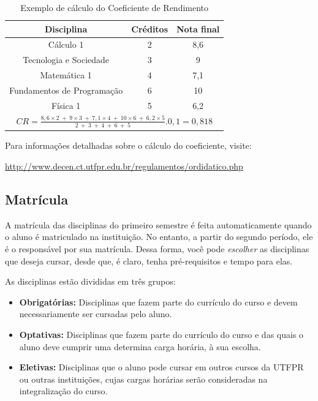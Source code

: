 \documentclass[a4paper,12pt,openany]{article}
\begin{document}
\begin{table}[h!] \centering
    \begin{spacing}{1.5}
    \begin{tabular}{|c|c|c|} \hline
        Disciplina & Créditos & Nota final \\ \hline
        Cálculo 1 & 2 & 8,6 \\ \hline
        Tecnologia e Sociedade & 3 & 9 \\ \hline
        Matemática 1 & 4 & 7,1 \\ \hline
        Fundamentos de Programação & 6 & 10 \\ \hline
        Física 1 & 5 & 6,2 \\ \hline
        \multicolumn{3}{|c|}{$CR = \frac{8,6 \times 2\ +\ 9 \times 3\ +\ 7,1 \times 4\ +\ 10 \times 6\ +\ 6,2 \times 5}{2\ +\ 3\ +\ 4\ +\ 6\ +\ 5} . 0,1 = 0,818 $ } \\ \hline
    \end{tabular}
    \end{spacing}
    \caption{Exemplo de cálculo do Coeficiente de Rendimento}
    \label{tbl01}

\end{table}

Para informações detalhadas sobre o cálculo do coeficiente, visite: 

\url{http://www.decen.ct.utfpr.edu.br/regulamentos/ordidatico.php}



\subsection{Matrícula}

A matrícula das disciplinas do primeiro semestre é feita automaticamente quando o aluno é matriculado na instituição. No entanto, a partir do segundo período, ele é o responsável por sua matrícula. Dessa forma, você pode \textit{escolher} as disciplinas que deseja cursar, desde que, é claro, tenha pré-requisitos e tempo para elas. 

As disciplinas estão divididas em três grupos:

\begin{itemize}

    \item \textbf{Obrigatórias:} Disciplinas que fazem parte do currículo do curso e devem necessariamente ser cursadas pelo aluno.

    \item \textbf{Optativas:} Disciplinas que fazem parte do currículo do curso e das quais o aluno deve cumprir uma determina carga horária, à sua escolha.

    \item \textbf{Eletivas:} Disciplinas que o aluno pode cursar em outros cursos da UTFPR ou outras instituições, cujas cargas horárias serão consideradas na integralização do curso.

\end{itemize}
\end{document}
